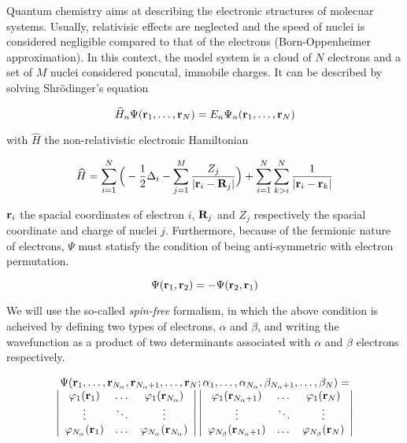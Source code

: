 \documentclass[./thesis.tex]{subfiles}
\begin{document}
Quantum chemistry aims at describing the electronic structures of molecuar systems.
Usually, relativisic effects are neglected and the speed of nuclei is considered negligible compared to that of the electrons (Born-Oppenheimer approximation). In this context, the model system is a cloud of $N$ electrons and a set of $M$ nuclei considered poncutal, immobile charges. It can be described by solving Shrödinger's equation

\begin{equation}
 \widehat{H}_n \Psi({\bf r}_1,\dots,{\bf r}_N) = E_n \Psi_n({\bf r}_1,\dots,{\bf r}_N)
\end{equation}

with $\widehat H$ the non-relativistic electronic Hamiltonian

\begin{equation}
\widehat{H} = \sum_{i=1}^{N} \Big ( -\frac{1}{2} \Delta_i - \sum_{j=1}^M \frac{Z_j}{|{\bf r}_i - {\bf R}_j|} \Big ) + \sum_{i=1}^{N} \sum_{k>i}^{N} \frac{1}{|{\bf r}_i - {\bf r}_k|}
\end{equation}


${\bf r}_i$ the spacial coordinates of electron $i$, ${\bf R}_j$ and $Z_j$ respectively the spacial coordinate and charge of nuclei $j$. Furthermore, because of the fermionic nature of electrons, $\Psi$ must statisfy the condition of being anti-symmetric with electron permutation.

\begin{equation}
\Psi({\bf r}_1, {\bf r}_2) = -\Psi({\bf r}_2, {\bf r}_1)
\end{equation}


We will use the so-called \emph{spin-free} formalism, in which the above condition is acheived by defining two types of electrons, $\alpha$ and $\beta$, and writing the wavefunction as a product of two determinants associated with $\alpha$ and $\beta$ electrons respectively.

\begin{equation}
\begin{array}{c}
 \Psi({\bf r}_1,\dots,{\bf r}_{{N_\alpha}},{\bf r}_{{N_\alpha}+1},\dots,{\bf r}_N;
      \alpha_1,\dots,\alpha_{{N_\alpha}},\beta_{{N_\alpha}+1},\dots,\beta_N) = \\
\left|
 \begin{array}{ccc}
 \varphi_1({\bf r}_1) & \dots & \varphi_1({\bf r}_{{N_\alpha}}) \\
 \vdots               & \ddots &   \vdots             \\
 \varphi_{{N_\alpha}}({\bf r}_1) & \dots & \varphi_{{N_\alpha}}({\bf r}_{{N_\alpha}}) \\
 \end{array}
\right|
\left|
 \begin{array}{ccc}
 \varphi_1({\bf r}_{{N_\alpha}+1}) & \dots & \varphi_1({\bf r}_{N}) \\
 \vdots               & \ddots &   \vdots             \\
 \varphi_{N_\beta}({\bf r}_{{N_\alpha}+1}) & \dots & \varphi_{N_\beta}({\bf r}_{N}) \\
 \end{array}
\right|
\end{array} 
\label{eq:slater}
\end{equation}
\end{document}
